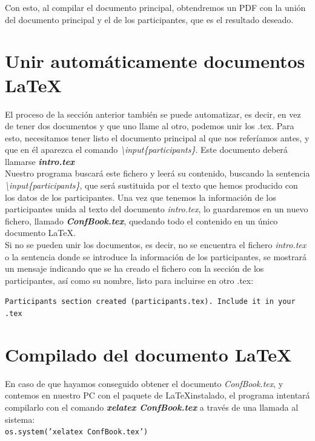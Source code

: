 \documentclass[a4paper, 12pt]{book}
\begin{document}
Con esto, al compilar el documento principal, obtendremos un PDF con la unión del documento principal y el de los participantes, que es el resultado deseado.


\section{Unir automáticamente documentos \LaTeX}
\label{sec:uneLatex}
El proceso de la sección anterior también se puede automatizar, es decir, en vez de tener dos documentos y que uno llame al otro, podemos unir los .tex. Para esto, necesitamos tener listo el documento principal al que nos referíamos antes, y que en él aparezca el comando \mbox{\textit{\textbackslash input\{participants\}}}. Este documento deberá llamarse \textbf{\textit{intro.tex}}\\

Nuestro programa buscará este fichero y leerá su contenido, buscando la sentencia \mbox{\textit{\textbackslash input\{participants\}}}, que será sustituida por el texto que hemos producido con los datos de los participantes. Una vez que tenemos la información de los participantes unida al texto del documento \textit{intro.tex}, lo guardaremos en un nuevo fichero, llamado \textbf{\textit{ConfBook.tex}}, quedando todo el contenido en un único documento \LaTeX.\\

Si no se pueden unir los documentos, es decir, no se encuentra el fichero \textit{intro.tex} o la sentencia donde se introduce la información de los participantes, se mostrará un mensaje indicando que se ha creado el fichero con la sección de los participantes, así como su nombre, listo para incluirse en otro .tex:

\texttt{Participants section created (participants.tex). Include it in your .tex}



\section{Compilado del documento \LaTeX}
\label{sec:compilado}
En caso de que hayamos conseguido obtener el documento \textit{ConfBook.tex}, y contemos en nuestro PC con el paquete de \LaTeX instalado, el programa intentará compilarlo con el comando \textbf{\textit{xelatex ConfBook.tex}} a través de una llamada al sistema:\\
\texttt{os.system('xelatex ConfBook.tex')}\\
\end{document}
